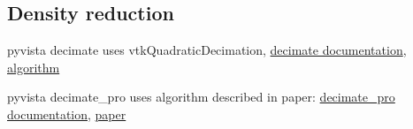 \documentclass[11pt]{article}
\theoremstyle{definition}
\begin{document}
\subsection{Density reduction}

pyvista decimate uses vtkQuadraticDecimation, \href{https://docs.pyvista.org/api/core/_autosummary/pyvista.polydatafilters.decimate}{decimate documentation}, \href{https://vtk.org/doc/nightly/html/classvtkQuadricDecimation.html}{algorithm}

pyvista decimate\_pro uses algorithm described in paper: \href{https://docs.pyvista.org/api/core/_autosummary/pyvista.polydatafilters.decimate_pro}{decimate\_pro documentation}, \href{https://dl.acm.org/doi/10.1145/133994.134010}{paper}
\end{document}
